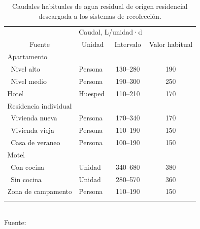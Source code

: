 \begin{table}[!ht]
	\centering
	\caption{Caudales habituales de agua residual de origen residencial descargada a los sistemas de recolección.}
	\label{tab:Qhabituales}
	\begin{tabular}{llcc}
		\noalign{\hrule height 3pt}
		\multicolumn{2}{c}{}                                    & \multicolumn{2}{c}{Caudal, L/unidad·d} \\ \cline{3-4} 
		\multicolumn{1}{c}{Fuente} & \multicolumn{1}{c}{Unidad} & Intervalo       & Valor habitual       \\ \hline
		Apartamento                &                            &                 &                      \\
		\space~Nivel alto                 & Persona                    & 130--280        & 190                  \\
		\space~Nivel medio                & Persona                    & 190--300        & 250                  \\
		Hotel                      & Huesped                    & 110--210        & 170                  \\
		Residencia individual      &                            &                 &                      \\
		\space~Vivienda nueva             & Persona                    & 170--340        & 170                  \\
		\space~Vivienda vieja             & Persona                    & 110--190        & 150                  \\
		\space~Casa de veraneo            & Persona                    & 100--190        & 150                  \\
		Motel                      &                            &                 &                      \\
		\space~Con cocina                 & Unidad                     & 340--680        & 380                  \\
		\space~Sin cocina                 & Unidad                     & 280--570        & 360                  \\
		Zona de campamento         & Persona                    & 110--190        & 150                  \\ \hline \\
	\end{tabular}
	\\\small{Fuente:~\cite{crites2000}}
\end{table}
